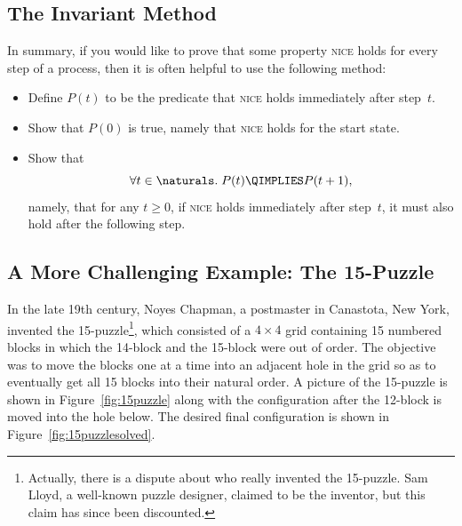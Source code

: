 \subsection{The Invariant Method}

In summary, if you would like to prove that some property
\textsc{nice} holds for every step of a process, then it is often
helpful to use the following method:
\begin{itemize}

\item
Define $P(t)$ to be the predicate that \textsc{nice} holds immediately
after step~$t$.

\item
Show that $P(0)$ is true, namely that \textsc{nice} holds for the
start state.

\item
Show that
\begin{equation*}
    \forall t \in \naturals. \; P(t) \QIMPLIES P(t + 1),
\end{equation*}
namely, that for any $t \ge 0$, if \textsc{nice} holds immediately
after step~$t$, it must also hold after the following step.

\end{itemize}

\subsection{A More Challenging Example: The
  15-Puzzle}\label{sec:15puzzle}

In the late 19th century, Noyes Chapman, a postmaster in Canastota,
New York, invented the 15-puzzle\footnote{Actually, there is a dispute
about who really invented the 15-puzzle.  Sam Lloyd, a well-known
puzzle designer, claimed to be the inventor, but this claim has since
been discounted.}, which consisted of a $4\times 4$ grid containing 15
numbered blocks in which the 14-block and the 15-block were out of
order.  The objective was to move the blocks one at a time into an
adjacent hole in the grid so as to eventually get all 15 blocks into
their natural order.  A picture of the 15-puzzle is shown in
Figure~\ref{fig:15puzzle} along with the configuration after the
12-block is moved into the hole below.  The desired final
configuration is shown in Figure~\ref{fig:15puzzlesolved}.

